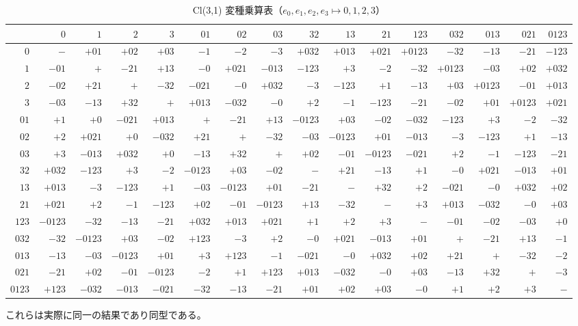 \documentclass[a4paper]{article}
\begin{document}
\begin{table}[ht]
  \begin{center}
    \caption{Cl(3,1) 変種乗算表（$e_0, e_1, e_2, e_3 \mapsto 0,1,2,3$）}
    \scriptsize
    \begin{tabular}{r|rrrrrrrrrrrrrrr}
      &$0$&$1$&$2$&$3$&$01$&$02$&$03$&$32$&$13$&$21$&$123$&$032$&$013$&$021$&$0123$\\\hline
      $0$&$-$&$+01$&$+02$&$+03$&$-1$&$-2$&$-3$&$+032$&$+013$&$+021$&$+0123$&$-32$&$-13$&$-21$&$-123$\\
      $1$&$-01$&$+$&$-21$&$+13$&$-0$&$+021$&$-013$&$-123$&$+3$&$-2$&$-32$&$+0123$&$-03$&$+02$&$+032$\\
      $2$&$-02$&$+21$&$+$&$-32$&$-021$&$-0$&$+032$&$-3$&$-123$&$+1$&$-13$&$+03$&$+0123$&$-01$&$+013$\\
      $3$&$-03$&$-13$&$+32$&$+$&$+013$&$-032$&$-0$&$+2$&$-1$&$-123$&$-21$&$-02$&$+01$&$+0123$&$+021$\\
      $01$&$+1$&$+0$&$-021$&$+013$&$+$&$-21$&$+13$&$-0123$&$+03$&$-02$&$-032$&$-123$&$+3$&$-2$&$-32$\\
      $02$&$+2$&$+021$&$+0$&$-032$&$+21$&$+$&$-32$&$-03$&$-0123$&$+01$&$-013$&$-3$&$-123$&$+1$&$-13$\\
      $03$&$+3$&$-013$&$+032$&$+0$&$-13$&$+32$&$+$&$+02$&$-01$&$-0123$&$-021$&$+2$&$-1$&$-123$&$-21$\\
      $32$&$+032$&$-123$&$+3$&$-2$&$-0123$&$+03$&$-02$&$-$&$+21$&$-13$&$+1$&$-0$&$+021$&$-013$&$+01$\\
      $13$&$+013$&$-3$&$-123$&$+1$&$-03$&$-0123$&$+01$&$-21$&$-$&$+32$&$+2$&$-021$&$-0$&$+032$&$+02$\\
      $21$&$+021$&$+2$&$-1$&$-123$&$+02$&$-01$&$-0123$&$+13$&$-32$&$-$&$+3$&$+013$&$-032$&$-0$&$+03$\\
      $123$&$-0123$&$-32$&$-13$&$-21$&$+032$&$+013$&$+021$&$+1$&$+2$&$+3$&$-$&$-01$&$-02$&$-03$&$+0$\\
      $032$&$-32$&$-0123$&$+03$&$-02$&$+123$&$-3$&$+2$&$-0$&$+021$&$-013$&$+01$&$+$&$-21$&$+13$&$-1$\\
      $013$&$-13$&$-03$&$-0123$&$+01$&$+3$&$+123$&$-1$&$-021$&$-0$&$+032$&$+02$&$+21$&$+$&$-32$&$-2$\\
      $021$&$-21$&$+02$&$-01$&$-0123$&$-2$&$+1$&$+123$&$+013$&$-032$&$-0$&$+03$&$-13$&$+32$&$+$&$-3$\\
      $0123$&$+123$&$-032$&$-013$&$-021$&$-32$&$-13$&$-21$&$+01$&$+02$&$+03$&$-0$&$+1$&$+2$&$+3$&$-$\\
    \end{tabular}
  \end{center}
\end{table}
これらは実際に同一の結果であり同型である。
\end{document}
